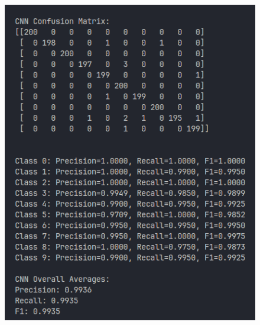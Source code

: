 \documentclass{article}
\begin{document}
\begin{itemize}
\begin{figure}[h]
\begin{minipage}{0.45\textwidth}
        \includegraphics[width=\linewidth]{2.png}
    \end{minipage}

    \vspace{0.3cm}  %


\end{figure}
\end{itemize}
\end{document}
